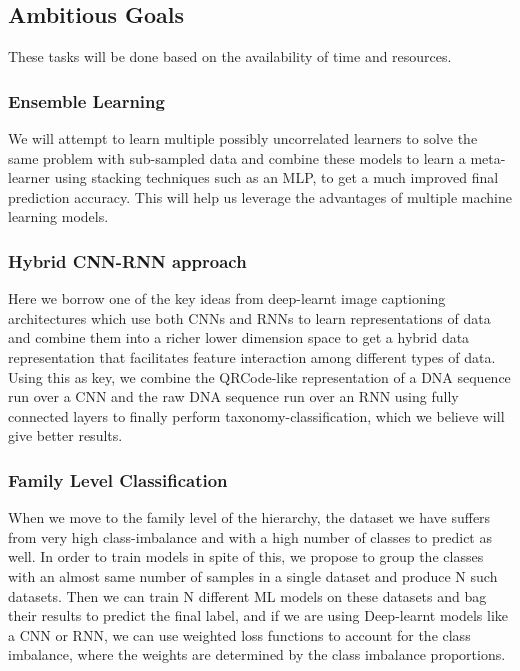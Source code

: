\documentclass[12pt]{article}
\begin{document}
    \subsection{Ambitious Goals}
        These tasks will be done based on the availability of time and resources.

        \subsubsection{Ensemble Learning}
        We will attempt to learn multiple possibly uncorrelated learners to solve the same problem with sub-sampled data and combine these models to learn a meta-learner using stacking techniques such as an MLP, to get a much improved final prediction accuracy. This will help us leverage the advantages of multiple machine learning models.

        \subsubsection{Hybrid CNN-RNN approach}
        Here we borrow one of the key ideas from deep-learnt image captioning architectures which use both CNNs and RNNs to learn representations of data and combine them into a richer lower dimension space to get a hybrid data representation that facilitates feature interaction among different types of data. Using this as key, we combine the QRCode-like representation of a DNA sequence run over a CNN and the raw DNA sequence run over an RNN using fully connected layers to finally perform taxonomy-classification, which we believe will give better results.

        \subsubsection{Family Level Classification}
        When we move to the family level of the hierarchy, the dataset we have suffers from very high class-imbalance and with a high number of classes to predict as well. In order to train models in spite of this, we propose to group the classes with an almost same number of samples in a single dataset and produce N such datasets. Then we can train N different ML models on these datasets and bag their results to predict the final label, and if we are using Deep-learnt models like a CNN or RNN, we can use weighted loss functions to account for the class imbalance, where the weights are determined by the class imbalance proportions.
\end{document}

